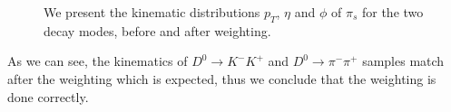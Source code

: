 \documentclass{article}
\begin{document}
    \begin{figure}[h!]
        \centering
        \hfill
        \caption{We present the kinematic distributions $p_T$, $\eta$ and $\phi$ of $\pi_s$ for the two decay modes, before and after weighting.}
    \end{figure}

    As we can see, the kinematics of $D^0\to K^-K^+$ and $D^0\to \pi^-\pi^+$ samples match after the weighting which is expected, thus we conclude that the weighting is done correctly.
    
\end{document}
